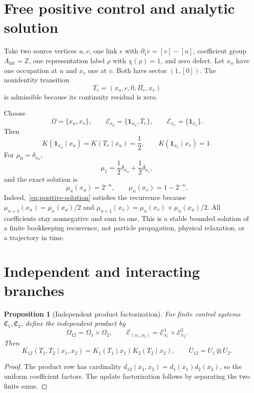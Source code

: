 \documentclass[11pt]{article}
\newtheorem{proposition}{Proposition}
\newcommand{\Control}{\mathfrak C}
\newcommand{\Enabled}{\mathcal E}
\begin{document}
\section{Free positive control and analytic solution}

Take two source vertices \(u,v\), one link \(e\) with
\(\partial_1e=[v]-[u]\), coefficient group \(A_{\mathrm{int}}=\mathbb Z\),
one representation label \(\rho\) with \(\chi(\rho)=1\), and zero defect.
Let \(x_u\) have one occupation at \(u\) and \(x_v\) one at \(v\). Both have
sector \((1,[0])\). The nonidentity transition
\[
  T_e=(x_u,e,0,\Pi_e,x_v)
\]
is admissible because its continuity residual is zero.

Choose
\[
  \Omega=\{x_u,x_v\},\qquad
  \Enabled_{x_u}=\{\mathbf1_{x_u},T_e\},\qquad
  \Enabled_{x_v}=\{\mathbf1_{x_v}\}.
\]
Then
\[
  K(\mathbf1_{x_u}\mid x_u)
  =
  K(T_e\mid x_u)=\frac12,
  \qquad
  K(\mathbf1_{x_v}\mid x_v)=1.
\]
For \(\mu_0=\delta_{x_u}\),
\[
  \mu_1=\frac12\delta_{x_u}+\frac12\delta_{x_v},
\]
and the exact solution is
\begin{equation}
  \mu_n(x_u)=2^{-n},
  \qquad
  \mu_n(x_v)=1-2^{-n}.
  \label{eq:positive-solution}
\end{equation}
Indeed,~\eqref{eq:positive-solution} satisfies the recurrence because
\(\mu_{n+1}(x_u)=\mu_n(x_u)/2\) and
\(\mu_{n+1}(x_v)=\mu_n(x_v)+\mu_n(x_u)/2\).
All coefficients stay nonnegative and sum to one. This is a stable bounded
solution of a finite bookkeeping recurrence, not particle propagation,
physical relaxation, or a trajectory in time.

\section{Independent and interacting branches}

\begin{proposition}[Independent product factorization]
For finite control systems \(\Control_1,\Control_2\), define the independent
product by
\[
  \Omega_{12}=\Omega_1\times\Omega_2,\qquad
  \Enabled_{(x_1,x_2)}
  =
  \Enabled^1_{x_1}\times\Enabled^2_{x_2}.
\]
Then
\[
  K_{12}(T_1,T_2\mid x_1,x_2)
  =
  K_1(T_1\mid x_1)K_2(T_2\mid x_2),
  \qquad
  U_{12}=U_1\otimes U_2.
\]
\end{proposition}

\begin{proof}
The product row has cardinality
\(d_{12}(x_1,x_2)=d_1(x_1)d_2(x_2)\), so the uniform coefficient factors.
The update factorization follows by separating the two finite sums.
\end{proof}
\end{document}
